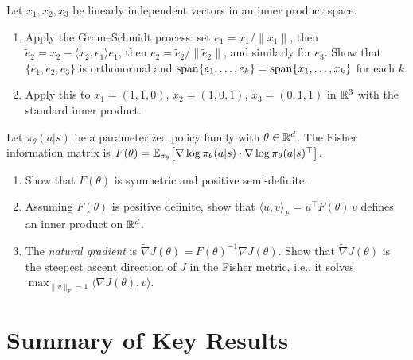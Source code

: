 \documentclass[11pt,a4paper]{article}
\begin{document}
\begin{exercise}
\label{ex:gram_schmidt}
Let $x_1, x_2, x_3$ be linearly independent vectors in an inner product
space.
\begin{enumerate}[label=(\alph*),nosep]
    \item Apply the Gram--Schmidt process: set $e_1 = x_1 / \|x_1\|$, then
          $\tilde{e}_2 = x_2 - \langle x_2, e_1 \rangle e_1$, then
          $e_2 = \tilde{e}_2 / \|\tilde{e}_2\|$, and similarly for $e_3$.
          Show that $\{e_1, e_2, e_3\}$ is orthonormal and
          $\operatorname{span}\{e_1, \ldots, e_k\} = \operatorname{span}\{x_1, \ldots, x_k\}$ for
          each $k$.
    \item Apply this to $x_1 = (1, 1, 0)$, $x_2 = (1, 0, 1)$,
          $x_3 = (0, 1, 1)$ in $\mathbb{R}^3$ with the standard inner product.
\end{enumerate}
\end{exercise}

\begin{exercise}
\label{ex:fisher}
Let $\pi_\theta(a | s)$ be a parameterized policy family with
$\theta \in \mathbb{R}^d$. The Fisher information matrix is
$F(\theta) = \mathbb{E}_{\pi_\theta}\bigl[\nabla \log \pi_\theta(a|s) \cdot
\nabla \log \pi_\theta(a|s)^\top\bigr]$.
\begin{enumerate}[label=(\alph*),nosep]
    \item Show that $F(\theta)$ is symmetric and positive semi-definite.
    \item Assuming $F(\theta)$ is positive definite, show that
          $\langle u, v \rangle_F = u^\top F(\theta)\, v$ defines an inner
          product on $\mathbb{R}^d$.
    \item The \emph{natural gradient} is $\tilde{\nabla} J(\theta) =
          F(\theta)^{-1} \nabla J(\theta)$. Show that $\tilde{\nabla}
          J(\theta)$ is the steepest ascent direction of $J$ in the
          Fisher metric, i.e., it solves
          $\max_{\|v\|_F = 1} \langle \nabla J(\theta), v \rangle$.
\end{enumerate}
\end{exercise}


\section{Summary of Key Results}
\label{sec:summary}
\end{document}
